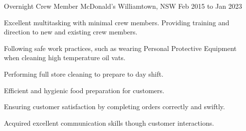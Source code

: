 \begin{cventries}
  \cventry
    {Overnight Crew Member} %
    { McDonald's} %
    {Williamtown, NSW} %
    {Feb 2015 to Jan 2023} %
    {
      \begin{cvitems} %
        \item {Excellent multitasking with minimal crew members. Providing training and direction to new and existing crew members.}
        \item {Following safe work practices, such as wearing Personal Protective Equipment when cleaning high temperature oil vats.}
        \item {Performing full store cleaning to prepare to day shift.}
        \item {Efficient and hygienic food preparation for customers.}
        \item {Ensuring customer satisfaction by completing orders correctly and swiftly.}
        \item {Acquired excellent communication skills though customer interactions.}
      \end{cvitems}
    }


\end{cventries}
